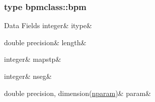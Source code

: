 \subsubsection{type bpmclass\+::bpm}
\begin{DoxyFields}{Data Fields}
\mbox{\label{namespacebpmclass_a8759ea53c8b66bbdb08055405fff79a0}} 
integer&
itype&
\\
\hline

\mbox{\label{namespacebpmclass_a91bf471e42c1c733f27253fe367c02e1}} 
double precision&
length&
\\
\hline

\mbox{\label{namespacebpmclass_a57b5d567476a69c20de780f6fb8d0a2e}} 
integer&
mapstp&
\\
\hline

\mbox{\label{namespacebpmclass_af47828f23a39ecfbef81048d780c4107}} 
integer&
nseg&
\\
\hline

\mbox{\label{namespacebpmclass_ab4cbff356dd68d8a0563cb3b1d4ae235}} 
double precision, dimension(\mbox{\hyperlink{namespacebpmclass_ac2f2f373976236d08c9c68de895950eb}{nparam}})&
param&
\\
\hline

\end{DoxyFields}
